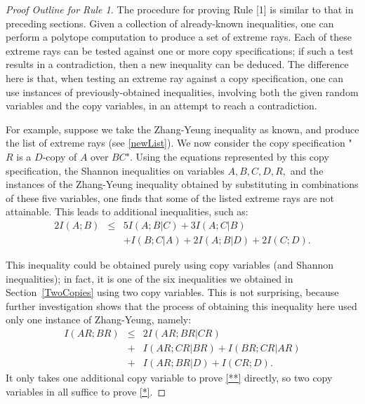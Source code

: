 \documentclass[10pt,journal]{IEEEtran}
\begin{document}
\begin{proof}[Proof Outline for Rule 1]
The procedure for proving Rule [1] is similar to that in preceding sections.
Given a collection of already-known inequalities, one can perform
a polytope computation to produce a set of extreme rays.  Each of
these extreme rays can be tested against one or more copy
specifications; if such a test results in a contradiction,
then a new inequality can be deduced.  The difference here is
that, when testing an extreme ray against a copy specification,
one can use instances of previously-obtained inequalities,
involving both the given random variables and the copy
variables, in an attempt to reach a contradiction.

For example, suppose we take the Zhang-Yeung inequality
as known, and produce the list of extreme rays (see \eqref{newList}).
We now consider the copy specification "$R$ is a
$D$-copy of $A$ over $BC$".  Using the equations represented by
this copy specification, the Shannon inequalities on
variables $A,B,C,D,R,$ and the instances of the Zhang-Yeung
inequality obtained by substituting in combinations of
these five variables, one finds that some of the
listed extreme rays are not attainable.  This leads to
additional inequalities, such as:
\begin{eqnarray}\label{*}
    2I(A;B) &\leq& 5I(A;B|C)+3I(A;C|B)\\
\nonumber    && +I(B;C|A)+2I(A;B|D)+2I(C;D).
\end{eqnarray}

This inequality could be obtained purely using copy variables
(and Shannon inequalities); in fact, it is one of the six
inequalities we obtained in Section~\ref{TwoCopies} using two copy variables.
This is not surprising, because further investigation shows
that the process of obtaining this inequality here used only
one instance of Zhang-Yeung, namely:
\begin{eqnarray}\label{**}
    I(AR;BR) &\leq& 2I(AR;BR|CR)\\
\nonumber     &+& I(AR;CR|BR) + I(BR;CR|AR)\\
\nonumber     &+& I(AR;BR|D)+I(CR;D).
\end{eqnarray}
It only takes one additional copy variable to prove \eqref{**}
directly, so two copy variables in all suffice to prove \eqref{*}.


\end{proof}
\end{document}
